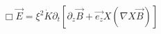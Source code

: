 \begin{equation}
{\Box}\vec{E}={\xi}^{2}\dot{K}{\partial}_{t}[{\partial}_{z}{\vec{B}}+\vec{e_{z}}X({\nabla}X\vec{B})]
\label{28}
\end{equation}

